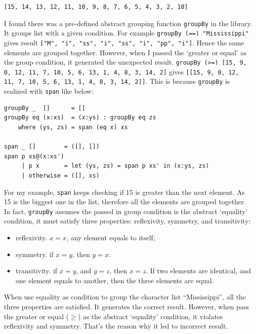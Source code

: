 \documentclass{article}
\begin{document}
\begin{verbatim}
[15, 14, 13, 12, 11, 10, 9, 8, 7, 6, 5, 4, 3, 2, 10]
\end{verbatim}

I found there was a pre-defined abstract grouping function \texttt{groupBy} in the library. It groups list with a given condition. For example \texttt{groupBy (==) "Mississippi"} gives result \texttt{["M", "i", "ss", "i", "ss", "i", "pp", "i"]}. Hence the same elements are grouped together. However, when I passed the `greater or equal' as the group condition, it generated the unexpected result. \texttt{groupBy (>=) [15, 9, 0, 12, 11, 7, 10, 5, 6, 13, 1, 4, 8, 3, 14, 2]} gives \texttt{[[15, 9, 0, 12, 11, 7, 10, 5, 6, 13, 1, 4, 8, 3, 14, 2]]}. This is because \texttt{groupBy} is realized with \texttt{span} like below:

\lstset{language=Haskell, frame=single}
\begin{lstlisting}
groupBy _  []      = []
groupBy eq (x:xs)  = (x:ys) : groupBy eq zs
    where (ys, zs) = span (eq x) xs

span _ []        = ([], [])
span p xs@(x:xs')
     | p x       = let (ys, zs) = span p xs' in (x:ys, zs)
     | otherwise = ([], xs)
\end{lstlisting}

For my example, \texttt{span} keeps checking if 15 is greater than the next element. As 15 is the biggest one in the list, therefore all the elements are grouped together. In fact, \texttt{groupBy} assumes the passed in group condition is the abstract `equality' condition, it must satisfy three properties: reflexivity, symmetry, and transitivity:

\begin{itemize}
\item reflexivity. $x = x$, any element equals to itself;
\item symmetry. if $x = y$, then $y = x$.
\item transitivity. if $x = y$, and $y = z$, then $x = z$. If two elements are identical, and one element equals to another, then the three elements are equal.
\end{itemize}

When use equality as condition to group the character list ``Mississippi'', all the three properties are satisfied. It generates the correct result. However, when pass the greater or equal ($\geq$) as the abstract `equality' condition, it violates reflexivity and symmetry. That's the reason why it led to incorrect result.
\end{document}
